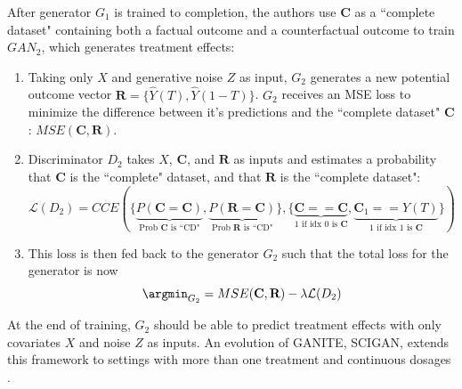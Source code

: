 After generator $G_1$ is trained to completion, the authors use $\textbf{C}$ as a ``complete dataset" containing both a factual outcome and a counterfactual outcome to train $GAN_2$, which generates treatment effects: 
\begin{enumerate}
\singlespacing
    \item Taking only $X$ and generative noise $Z$ as input, $G_2$ generates a new potential outcome vector $\textbf{R}=\{\hat{Y}(T),\hat{Y}(1-T)\}$. $G_2$ receives an MSE loss to minimize the difference between it's predictions and the ``complete dataset" $\textbf{C}$: $MSE(\textbf{C},\textbf{R})$.
    \item Discriminator $D_2$ takes $X$, $\textbf{C}$, and $\textbf{R}$ as inputs and estimates a probability that $\textbf{C}$ is the ``complete" dataset, and that $\textbf{R}$ is the ``complete dataset":
    \begin{equation}
    \mathcal{L}(D_2)=CCE(\{\underbrace{P(\textbf{C}=\textbf{C})}_{\text{ Prob $\textbf{C}$ is ``CD" }},\underbrace{P(\textbf{R}=\textbf{C})}_{\text{Prob $\textbf{R}$ is ``CD"}}\},\{\underbrace{\textbf{C}==\textbf{C}}_{\text{1 if idx 0 is $\textbf{C}$}},\underbrace{\textbf{C}_1==Y(T)}_{\text{1 if idx 1 is $\textbf{C}$}}\})
\end{equation}
    \item This loss is then fed back to the generator $G_2$ such that the total loss for the generator is now  
    \begin{equation}
        \argmin_{G_2}=MSE(\textbf{C},\textbf{R}) - \lambda \mathcal{L}(D_2)
    \end{equation}
\end{enumerate}
At the end of training, $G_2$ should be able to predict treatment effects with only covariates $X$ and noise $Z$ as inputs. An evolution of GANITE, SCIGAN, extends this framework to settings with more than one treatment and continuous dosages \citep{bica_sicgan}. 

